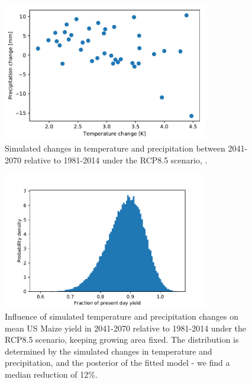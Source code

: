 \documentclass[12pt]{article}
\begin{document}
\begin{figure}
\centering
\includegraphics[width=0.8\textwidth]{./figures/sim_p_t_dist}
\caption{\label{fig:sim_p_t_dist} Simulated changes in temperature and precipitation between 2041-2070 relative to 1981-2014 under the RCP8.5 scenario, \citep[][]{ipcc2:2013}. }
\end{figure}

\begin{figure}
\centering
\includegraphics[width=0.8\textwidth]{./figures/simulated_impact}
\caption{\label{fig:simulated_impact} Influence of simulated temperature and precipitation changes \citep[][]{ipcc2:2013} on mean US Maize yield in 2041-2070 relative to 1981-2014 under the RCP8.5 scenario, keeping growing area fixed. The distribution is determined by the simulated changes in temperature and precipitation, and the posterior of the fitted model - we find a median reduction of 12\%. }
\end{figure}
\end{document}
